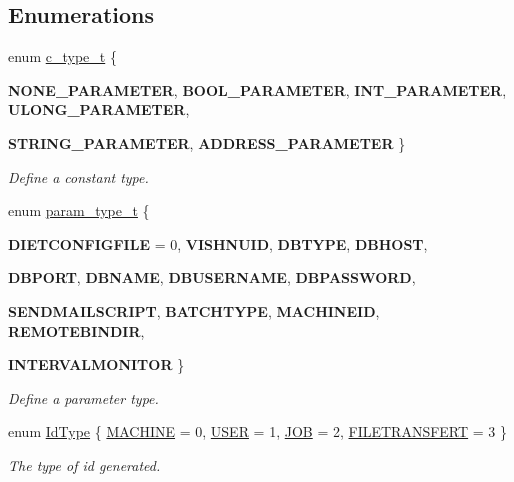\subsection*{Enumerations}
\begin{DoxyCompactItemize}
\item 
enum \hyperlink{namespacevishnu_ad8abe82f8ea57792411b26b9ed15287e}{c\_\-type\_\-t} \{ \par
{\bfseries NONE\_\-PARAMETER}, 
{\bfseries BOOL\_\-PARAMETER}, 
{\bfseries INT\_\-PARAMETER}, 
{\bfseries ULONG\_\-PARAMETER}, 
\par
{\bfseries STRING\_\-PARAMETER}, 
{\bfseries ADDRESS\_\-PARAMETER}
 \}
\begin{DoxyCompactList}\small\item\em Define a constant type. \item\end{DoxyCompactList}\item 
enum \hyperlink{namespacevishnu_afa06c1bb0b3442d83acb7650e8df75d1}{param\_\-type\_\-t} \{ \par
{\bfseries DIETCONFIGFILE} = 0, 
{\bfseries VISHNUID}, 
{\bfseries DBTYPE}, 
{\bfseries DBHOST}, 
\par
{\bfseries DBPORT}, 
{\bfseries DBNAME}, 
{\bfseries DBUSERNAME}, 
{\bfseries DBPASSWORD}, 
\par
{\bfseries SENDMAILSCRIPT}, 
{\bfseries BATCHTYPE}, 
{\bfseries MACHINEID}, 
{\bfseries REMOTEBINDIR}, 
\par
{\bfseries INTERVALMONITOR}
 \}
\begin{DoxyCompactList}\small\item\em Define a parameter type. \item\end{DoxyCompactList}\item 
enum \hyperlink{namespacevishnu_aff8a694c2bc2b55465a31b4bf00f58c1}{IdType} \{ \hyperlink{namespacevishnu_aff8a694c2bc2b55465a31b4bf00f58c1a18985dc599467035432920df9bcb2e8b}{MACHINE} =  0, 
\hyperlink{namespacevishnu_aff8a694c2bc2b55465a31b4bf00f58c1ae057d74230de0c43ca6fae4c80cd2898}{USER} =  1, 
\hyperlink{namespacevishnu_aff8a694c2bc2b55465a31b4bf00f58c1ac6a371f14311f16f9f476b7db284ac4f}{JOB} =  2, 
\hyperlink{namespacevishnu_aff8a694c2bc2b55465a31b4bf00f58c1afb06f51582220be5d9536a855abf0ae0}{FILETRANSFERT} =  3
 \}
\begin{DoxyCompactList}\small\item\em The type of id generated. \item\end{DoxyCompactList}\item 

\end{DoxyCompactItemize}
